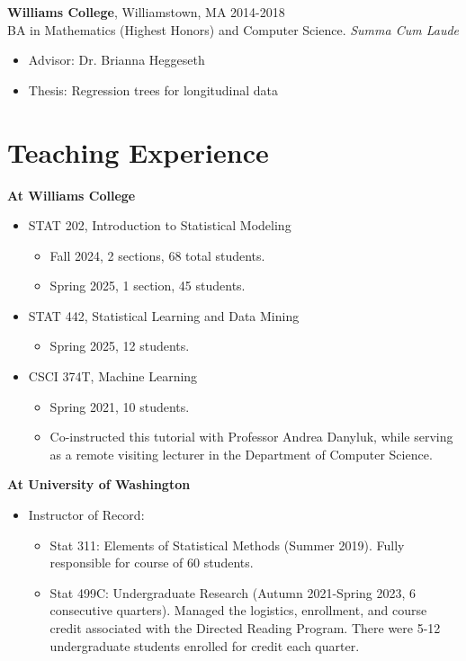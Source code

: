 \documentclass[margin, 10pt]{res}
\begin{document}
\begin{resume}
{\textbf{Williams College}}, Williamstown, MA \hfill 2014-2018  \\
BA in Mathematics (Highest Honors) and Computer Science. \textit{Summa Cum Laude} 
\begin{itemize}
\item Advisor: Dr. Brianna Heggeseth
\item Thesis: Regression trees for longitudinal data 
\end{itemize}
 
\section{Teaching Experience}
{\textbf{At Williams College}} 
\begin{itemize}
\item STAT 202, Introduction to Statistical Modeling
\begin{itemize}
\item Fall 2024, 2 sections, 68 total students.
\item Spring 2025, 1 section, 45 students.  
\end{itemize}
\item STAT 442, Statistical Learning and Data Mining 
\begin{itemize}
\item Spring 2025, 12 students.  
\end{itemize}	
\item CSCI 374T, Machine Learning
\begin{itemize}
\item Spring 2021, 10 students.
\item Co-instructed this tutorial with Professor Andrea Danyluk, while serving as a remote visiting lecturer in the Department of Computer Science. 
\end{itemize}
\end{itemize}
{\textbf{At University of Washington}} 
\begin{itemize}
\item Instructor of Record:
\begin{itemize}
\item Stat 311: Elements of Statistical Methods (Summer 2019). Fully responsible for course of 60 students. 
\item Stat 499C: Undergraduate Research (Autumn 2021-Spring 2023, 6 consecutive quarters). Managed the logistics, enrollment, and course credit associated with the Directed Reading Program. There were 5-12 undergraduate students enrolled for credit each quarter.   

\end{itemize}
\end{itemize}
\end{resume}
\end{document}
